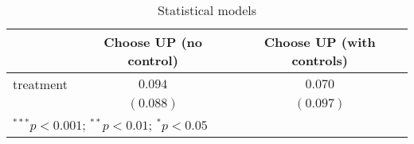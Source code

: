 
\begin{table}
\begin{center}
\begin{tabular}{l c c}
\hline
 & Choose UP (no control) & Choose UP (with controls) \\
\hline
treatment & $0.094$   & $0.070$   \\
          & $(0.088)$ & $(0.097)$ \\
\hline
\multicolumn{3}{l}{\scriptsize{$^{***}p<0.001$; $^{**}p<0.01$; $^{*}p<0.05$}}
\end{tabular}
\caption{Statistical models}
\label{Table S5: Average Treatment Effects}
\end{center}
\end{table}
